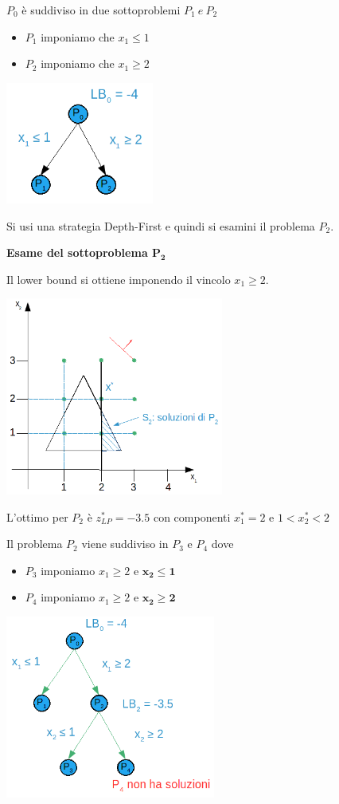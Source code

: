 $P_{0}$ è suddiviso in due sottoproblemi $P_{1}\ e\ P_{2}$
\begin{itemize}
	\item $P_{1}$ imponiamo che $x_{1}\le 1$
	\item $P_{2}$ imponiamo che $x_{1}\ge 2$
\end{itemize}

\centerline{\includegraphics[height=4cm]{images/graph20.png}}
Si usi una strategia Depth-First e quindi si esamini il problema $P_{2}$.

\textbf{Esame del sottoproblema $\boldsymbol{P_{2}}$}

Il lower bound si ottiene imponendo il vincolo $x_{1}\ge 2$.

\centerline{\includegraphics[height=6.5cm]{images/graph21.png}}
L'ottimo per $P_{2}$ è $z_{LP}^{*}=-3.5$ con componenti $x_{1}^{*}=2$ e $1<x_{2}^{*}<2$

Il problema $P_{2}$ viene suddiviso in $P_{3}$ e $P_{4}$ dove
\begin{itemize}
	\item $P_{3}$ imponiamo $x_{1}\ge 2$ e \underline{$\boldsymbol{x_{2}\le 1}$}
	\item $P_{4}$ imponiamo $x_{1}\ge 2$ e \underline{$\boldsymbol{x_{2}\ge 2}$}
\end{itemize}

\centerline{\includegraphics[height=6cm]{images/graph22.png}}

